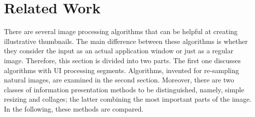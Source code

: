 \documentclass[draft,final]{vutinfth} %
\begin{document}
	\chapter{Related Work}
	There are several image processing algorithms that can be helpful at creating illustrative thumbnails.
	The main difference between these algorithms is whether they consider the input as an actual application window or just as a regular image.
	Therefore, this section is divided into two parts.
	The first one discusses algorithms with UI processing segments.
	Algorithms, invented for re-sampling natural images, are examined in the second section. 
	Moreover, there are two classes of information presentation methods to be distinguished, namely, simple resizing and collages; the latter combining the most important parts of the image. 
	In the following, these methods are compared.
	
\end{document}
